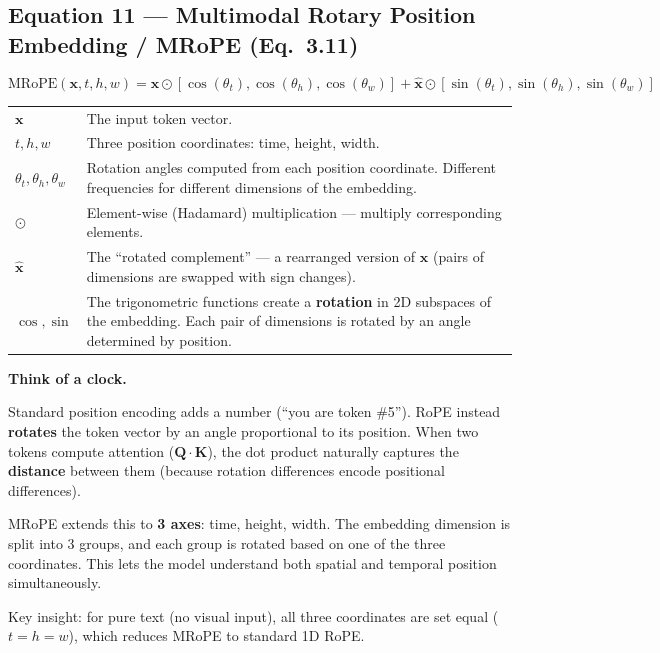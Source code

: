 \documentclass[12pt, a4paper]{article}
\begin{document}
\subsection{Equation 11 --- Multimodal Rotary Position Embedding / MRoPE (Eq.~3.11)}

\begin{eqbox}
\[
\text{MRoPE}(\mathbf{x}, t, h, w) = \mathbf{x} \odot \left[\cos(\theta_t), \cos(\theta_h), \cos(\theta_w)\right] + \hat{\mathbf{x}} \odot \left[\sin(\theta_t), \sin(\theta_h), \sin(\theta_w)\right]
\]
\end{eqbox}

\begin{explainbox}
\begin{tabular}{lp{11cm}}
$\mathbf{x}$ & The input token vector.\\[0.2cm]
$t, h, w$ & Three position coordinates: time, height, width.\\[0.2cm]
$\theta_t, \theta_h, \theta_w$ & Rotation angles computed from each position coordinate. Different frequencies for different dimensions of the embedding.\\[0.2cm]
$\odot$ & Element-wise (Hadamard) multiplication --- multiply corresponding elements.\\[0.2cm]
$\hat{\mathbf{x}}$ & The ``rotated complement'' --- a rearranged version of $\mathbf{x}$ (pairs of dimensions are swapped with sign changes).\\[0.2cm]
$\cos, \sin$ & The trigonometric functions create a \textbf{rotation} in 2D subspaces of the embedding. Each pair of dimensions is rotated by an angle determined by position.
\end{tabular}
\end{explainbox}

\begin{analogybox}
\textbf{Think of a clock.}

Standard position encoding adds a number (``you are token \#5''). RoPE instead \textbf{rotates} the token vector by an angle proportional to its position. When two tokens compute attention ($\mathbf{Q} \cdot \mathbf{K}$), the dot product naturally captures the \textbf{distance} between them (because rotation differences encode positional differences).

MRoPE extends this to \textbf{3 axes}: time, height, width. The embedding dimension is split into 3 groups, and each group is rotated based on one of the three coordinates. This lets the model understand both spatial and temporal position simultaneously.

Key insight: for pure text (no visual input), all three coordinates are set equal ($t = h = w$), which reduces MRoPE to standard 1D RoPE.
\end{analogybox}
\end{document}

